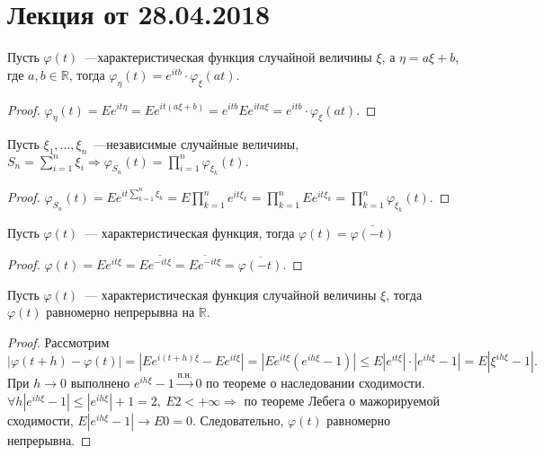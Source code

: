	\section{Лекция от 28.04.2018}

	\begin{property}
		Пусть \(\varphi(t)\)~---характеристическая функция случайной величины \(\xi\), а \(\eta = a\xi + b\), где \(a, b \in \mathbb{R}\), тогда \(\varphi_\eta(t) = e^{itb}\cdot \varphi_\xi(at).\)
		\begin{proof}
			\(\varphi_\eta(t) = Ee^{it\eta} = Ee^{it(a\xi + b)} = e^{itb}Ee^{ita\xi} = e^{itb}\cdot \varphi_\xi(at).\)
		\end{proof}
	\end{property}

	\begin{property}
		Пусть \(\xi_1, \ldots, \xi_n\)~---независимые случайные величины, \(S_n = \sum\limits_{i = 1}^{n}\xi_i \Rightarrow \varphi_{S_n}(t) = \prod\limits_{i = 1}^n\varphi_{\xi_k}(t).\)  
		\begin{proof}
			\(\varphi_{S_n}(t) = Ee^{it \sum\limits_{k = 1}^{n}\xi_k} = E\prod\limits_{k = 1}^n e^{it\xi_k} = \prod\limits_{k = 1}^{n}Ee^{it\xi_k} = \prod\limits_{k = 1}^{n}\varphi_{\xi_k}(t).\)
		\end{proof}
	\end{property}
	\begin{property}
		Пусть \(\varphi(t)\)~--- характеристическая функция, тогда \(\varphi(t) = \overline{\varphi(-t)}\)
		\begin{proof}
			\(\varphi(t) = Ee^{it\xi} = E\overline{e^{-it\xi}} = \overline{Ee^{-it\xi}} = \overline{\varphi(-t)}.\)
		\end{proof}
	\end{property}
	\begin{property}
		Пусть \(\varphi(t)\)~--- характеристическая функция случайной величины \(\xi\), тогда \(\varphi(t)\) равномерно непрерывна на \(\mathbb{R}.\)
		\begin{proof}
			Рассмотрим \(|\varphi(t + h) - \varphi(t)| = |Ee^{i(t+h)\xi} - Ee^{it\xi}| = |Ee^{it\xi}(e^{ih\xi} - 1)| \leqslant E|e^{it\xi}|\cdot |e^{ih\xi} - 1| = E|\xi^{ih\xi} - 1|.\)
			При \(h \to 0\) выполнено \(e^{ih\xi} - 1 \overset{\text{п.н.}} \longrightarrow 0 \) по теореме о наследовании сходимости. \(\forall h |e^{ih\xi} - 1| \leqslant |e^{ih\xi}| + 1 = 2, ~ E2 < +\infty \Rightarrow\) по теореме Лебега о мажорируемой сходимости, \(E|e^{ih\xi} - 1| \to E0 = 0.\) Следовательно, \(\varphi(t)\) равномерно непрерывна.
		\end{proof}
	\end{property}

